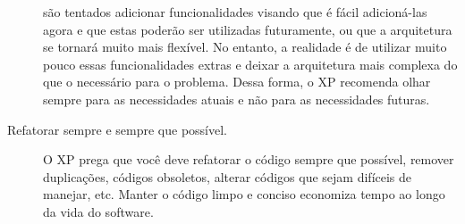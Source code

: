 \begin{description}
    são tentados adicionar funcionalidades visando que é fácil adicioná-las agora e
    que estas poderão ser utilizadas futuramente, ou que a arquitetura se tornará
    muito mais flexível. No entanto, a realidade é de utilizar muito pouco essas
    funcionalidades extras e deixar a arquitetura mais complexa do que o necessário
    para o problema. Dessa forma, o \gls{XP} recomenda olhar sempre para as
    necessidades atuais e não para as necessidades futuras.
    \item[Refatorar sempre e sempre que possível.] O \gls{XP} prega que você deve
    refatorar o código sempre que possível, remover duplicações, códigos obsoletos,
    alterar códigos que sejam difíceis de manejar, etc. Manter o código limpo e
    conciso economiza tempo ao longo da vida do software.
\end{description}

